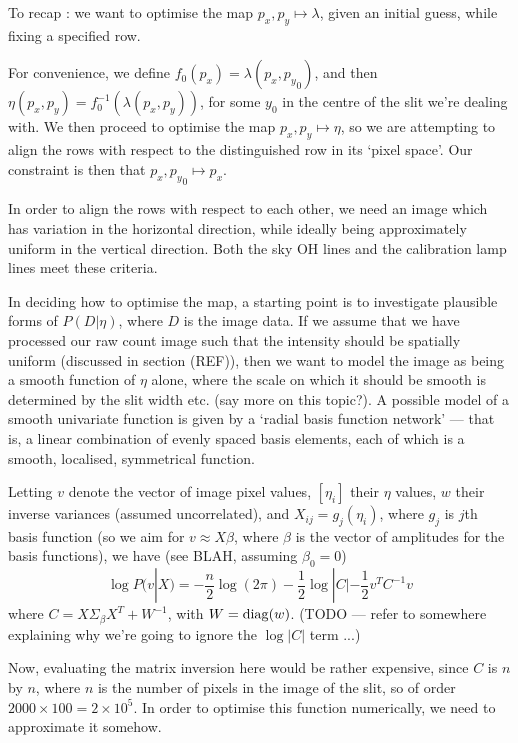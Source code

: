 To recap : we want to optimise the map $p_x, p_y \mapsto \lambda$, given
an initial guess, while fixing a specified row. 

For convenience, we define $f_0 (p_x) = \lambda (p_x, {p_y}_0)$, and
then $\eta (p_x, p_y) = f_0^{-1} (\lambda (p_x, p_y))$, for some $y_0$
in the centre of the slit we're dealing with. We then proceed to
optimise the map $p_x, p_y \mapsto \eta$, so we are attempting to align
the rows with respect to the distinguished row in its `pixel space'. Our
constraint is then that $p_x, {p_y}_0 \mapsto p_x$.

In order to align the rows with respect to each other, we need
an image which has variation in the horizontal direction, while ideally
being approximately uniform in the vertical direction. Both the sky OH
lines and the calibration lamp lines meet these criteria.

In deciding how to optimise the map, a starting point is to investigate
plausible forms of $P(D|\eta)$, where $D$ is the image data. If we
assume that we have processed our raw count image such that the
intensity should be spatially uniform (discussed in section (REF)), then
we want to model the image as being a smooth function of $\eta$ alone,
where the scale on which it should be smooth is determined by the slit
width etc. (say more on this topic?). A possible model of a smooth
univariate function is given by a `radial basis function network' ---
that is, a linear combination of evenly spaced basis elements, each
of which is a smooth, localised, symmetrical function.

Letting $v$ denote the vector of image pixel values, $[\eta_i]$ their $\eta$
values, $w$ their inverse variances (assumed uncorrelated), and $X_{ij}
= g_j (\eta_i)$, where $g_j$ is $j$th basis function (so we aim for $v
\approx X \beta$, where $\beta$ is the vector of amplitudes for the
basis functions), we have (see BLAH, assuming $\beta_0 = 0$)
\[
\log P(v|X) = -\frac{n}{2}\log (2 \pi) - \frac{1}{2} \log |C| - \frac{1}{2}
v^T C^{-1} v
\]
where $C = X \Sigma_\beta X^T + W^{-1}$, with $W = {\rm diag}(w)$.
(TODO --- refer to somewhere explaining why we're going to ignore
the $\log |C|$ term ...)

Now, evaluating the matrix inversion here would be rather expensive, since
$C$ is $n$ by $n$, where $n$ is the number of pixels in the image of the slit, so
of order $2000 \times 100 = 2 \times 10^5$. In order to optimise this function
numerically, we need to approximate it somehow. 

